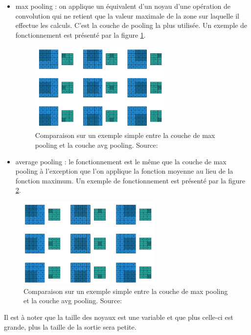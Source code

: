 \begin{itemize}
 \item max pooling : on applique un équivalent d'un noyau d'une opération de convolution qui ne retient que la valeur maximale de la zone sur laquelle il effectue les calculs. C'est la couche de pooling la plus utilisée. Un exemple de fonctionnement est présenté par la figure \ref{max_pooling}.
 
\begin{figure}[!h]
\centering
\includegraphics[width=200pt]{images/cnn/max_pooling.png}
\caption{Comparaison sur un exemple simple entre la couche de max pooling et la couche avg pooling. Source:\cite{dumoulin_guide_2018}}
\label{max_pooling}
\end{figure}
 
\item average pooling : le fonctionnement est le même que la couche de max pooling à l'exception que l'on applique la fonction moyenne au lieu de la fonction maximum. Un exemple de fonctionnement est présenté par la figure \ref{avg_pooling}.
\end{itemize}

\begin{figure}[!h]
\centering
\includegraphics[width=200pt]{images/cnn/avg_pooling.png}
\caption{Comparaison sur un exemple simple entre la couche de max pooling et la couche avg pooling. Source:\cite{dumoulin_guide_2018}}
\label{avg_pooling}
\end{figure}


Il est à noter que la taille des noyaux est une variable et que plus celle-ci est grande, plus la taille de la sortie sera petite. 

